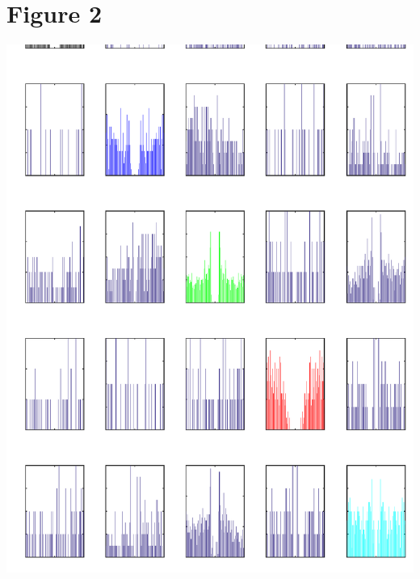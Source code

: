 \documentclass{article}
\begin{document}
\section{Figure 2}
\includegraphics[width=\textwidth]{Figure2.png}
\end{document}
